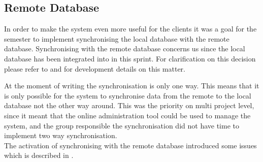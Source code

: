 \subsection{Remote Database}\label{sec:developments:remotedb}
In order to make the \giraf system even more useful for the clients it was a goal for the semester to implement synchronising the local database with the remote database.
Synchronising with the remote database concerns us since the local database has been integrated into \launcher in this sprint. For clarification on this decision please refer to  and  for development details on this matter.

At the moment of writing the synchronisation is only one way. This means that it is only possible for the system to synchronise data from the remote to the local database not the other way around. This was the priority on multi project level, since it meant that the online administration tool could be used to manage the system, and the group responsible the synchronisation did not have time to implement two way synchronisation.\\

The activation of synchronising with the remote database introduced some issues which is described in .